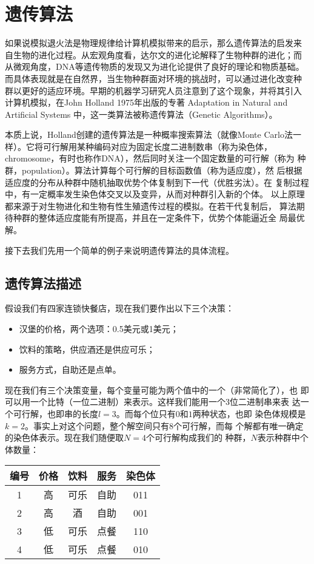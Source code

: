 \chapter{遗传算法}
如果说模拟退火法是物理规律给计算机模拟带来的启示，那么遗传算法的启发来
自生物的进化过程。从宏观角度看，达尔文的进化论解释了生物种群的进化；而
从微观角度，DNA等遗传物质的发现又为进化论提供了良好的理论和物质基础。
而具体表现就是在自然界，当生物种群面对环境的挑战时，可以通过进化改变种
群以更好的适应环境。早期的机器学习研究人员注意到了这个现象，并将其引入
计算机模拟，在John Holland 1975年出版的专著 Adaptation in Natural and
Artificial Systems\cite{Holland1975} 中，这一类算法被称遗传算法（Genetic Algorithms）。

本质上说，Holland创建的遗传算法是一种概率搜索算法（就像Monte Carlo法一
  样）。它将可行解用某种编码对应为固定长度二进制数串（称为染色体，
  chromosome，有时也称作DNA），然后同时关注一个固定数量的可行解（称为
  种群，population）。算法计算每个可行解的目标函数值（称为适应度），然
后根据适应度的分布从种群中随机抽取优势个体复制到下一代（优胜劣汰）。在
复制过程中，有一定概率发生染色体交叉以及变异，从而对种群引入新的个体。
以上原理都来源于对生物进化和生物有性生殖遗传过程的模拟。在若干代复制后，
算法期待种群的整体适应度能有所提高，并且在一定条件下，优势个体能逼近全
局最优解。

接下去我们先用一个简单的例子来说明遗传算法的具体流程。

\section{遗传算法描述}
假设我们有四家连锁快餐店，现在我们要作出以下三个决策：
\begin{itemize}
\item 汉堡的价格，两个选项：0.5美元或1美元；
\item 饮料的策略，供应酒还是供应可乐；
\item 服务方式，自助还是点单。
\end{itemize}

现在我们有三个决策变量，每个变量可能为两个值中的一个（非常简化了），也
即可以用一个比特（一位二进制）来表示。这样我们能用一个3位二进制串来表
达一个可行解，也即串的长度$l = 3$。而每个位只有$0$和$1$两种状态，也即
染色体规模是$k = 2$。事实上对这个问题，整个解空间只有$8$个可行解，而每
个解都有唯一确定的染色体表示。现在我们随便取$N = 4$个可行解构成我们的
种群，$N$表示种群中个体数量：

\begin{center}
  \begin{tabular}[!p]{ccccc}
\hline
编号 & 价格 & 饮料  & 服务 & 染色体\\
\hline
1 & 高 & 可乐 & 自助 & 011 \\
\hline
2 & 高 & 酒 & 自助 & 001 \\
\hline
3 & 低 & 可乐 & 点餐 & 110 \\
\hline
4 & 低 & 可乐 & 点餐 & 010 \\
\hline
\end{tabular}
\end{center}

